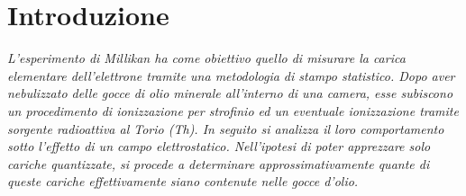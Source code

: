 \section{Introduzione}
\textit{L'esperimento di Millikan ha come obiettivo quello di misurare la carica elementare dell'elettrone tramite una metodologia di stampo statistico.
Dopo aver nebulizzato delle gocce di olio minerale all'interno di una camera, esse subiscono un procedimento di ionizzazione per strofinio ed un eventuale ionizzazione tramite sorgente radioattiva al Torio (Th). In seguito si analizza il loro comportamento sotto l'effetto di un campo elettrostatico.
Nell'ipotesi di poter apprezzare solo cariche quantizzate, si procede a determinare approssimativamente quante di queste cariche effettivamente siano contenute nelle gocce d'olio.}